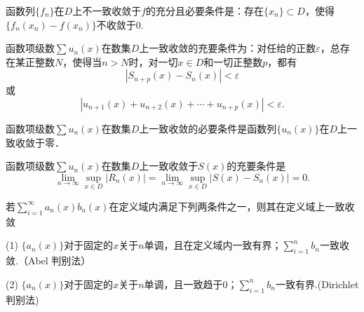 \documentclass[../../main.tex]{subfiles}
\begin{document}
\begin{corollary}\label{corollary:函数列不一致收敛的充要条件}
函数列\(\{f_n\}\)在\(D\)上不一致收敛于\(f\)的充分且必要条件是：存在\(\{x_n\} \subset D\)，使得\(\{f_n(x_n) - f(x_n)\}\)不收敛于\(0\).
\end{corollary}

\begin{theorem}[一致收敛的柯西准则]\label{theorem:一致收敛的柯西准则}
函数项级数\(\sum u_n(x)\)在数集\(D\)上一致收敛的充要条件为：对任给的正数\(\varepsilon\)，总存在某正整数\(N\)，使得当\(n > N\)时，对一切\(x \in D\)和一切正整数\(p\)，都有
\[
|S_{n + p}(x) - S_n(x)| < \varepsilon
\]
或
\[
|u_{n + 1}(x) + u_{n + 2}(x) + \cdots + u_{n + p}(x)| < \varepsilon.
\]
\end{theorem}

\begin{corollary}
函数项级数\(\sum u_n(x)\)在数集\(D\)上一致收敛的必要条件是函数列\(\{u_n(x)\}\)在\(D\)上一致收敛于零．
\end{corollary} 

\begin{theorem}
函数项级数\(\sum u_n(x)\)在数集\(D\)上一致收敛于\(S(x)\)的充要条件是
\[
\lim_{n \to \infty} \sup_{x \in D} |R_n(x)| = \lim_{n \to \infty} \sup_{x \in D} |S(x) - S_n(x)| = 0.
\]
\end{theorem}

\begin{theorem}[A-D判别法]\label{theorem:级数一致收敛的A-D判别法}
若\(\sum_{i = 1}^{\infty} a_n(x)b_n(x)\)在定义域内满足下列两条件之一，则其在定义域上一致收敛

(1) \(\{a_n(x)\}\)对于固定的\(x\)关于\(n\)单调，且在定义域内一致有界；\(\sum_{i = 1}^{n} b_n\)一致收敛.（Abel 判别法）

(2) \(\{a_n(x)\}\)对于固定的\(x\)关于\(n\)单调，且一致趋于\(0\)；\(\sum_{i = 1}^{n} b_n\)一致有界.(Dirichlet判别法)
\end{theorem}
\end{document}
